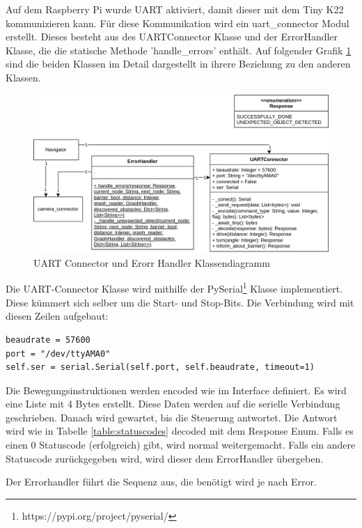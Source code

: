 Auf dem Raspberry Pi wurde UART aktiviert, damit dieser mit dem Tiny K22 kommunizieren kann.
Für diese Kommunikation wird ein uart\_connector Modul erstellt. Dieses besteht aus des UARTConnector Klasse und der ErrorHandler Klasse, die die statische Methode 'handle\_errors' enthält. Auf folgender Grafik \ref{fig:uart-connector-nav} sind die beiden Klassen im Detail dargestellt in ihrere Beziehung zu den anderen Klassen.

\begin{figure}[H]
\centering
\includegraphics[width=\textwidth]{assets/IT/robot-sw-architecture-uart-connector.png}
\caption{UART Connector und Erorr Handler Klassendiagramm}
\label{fig:uart-connector-nav}
\end{figure}

Die UART-Connector Klasse  wird mithilfe der PySerial\footnote{https://pypi.org/project/pyserial/} Klasse implementiert. Diese kümmert sich selber um die Start- und Stop-Bits.
Die Verbindung wird mit diesen Zeilen aufgebaut:
\begin{verbatim}
beaudrate = 57600
port = "/dev/ttyAMA0"
self.ser = serial.Serial(self.port, self.beaudrate, timeout=1)
\end{verbatim}

Die Bewegungsinstruktionen werden encoded wie im Interface definiert. Es wird eine Liste mit 4 Bytes erstellt.
Diese Daten werden auf die serielle Verbindung geschrieben.
Danach wird gewartet, bis die Steuerung antwortet. Die Antwort wird wie in Tabelle \ref{table:statuscodes} decoded mit dem Response Enum.
Falls es einen 0 Statuscode (erfolgreich) gibt, wird normal weitergemacht. Falls ein andere Statuscode zurückgegeben wird, wird dieser dem ErrorHandler übergeben.

Der Errorhandler führt die Sequenz aus, die benötigt wird je nach Error.

